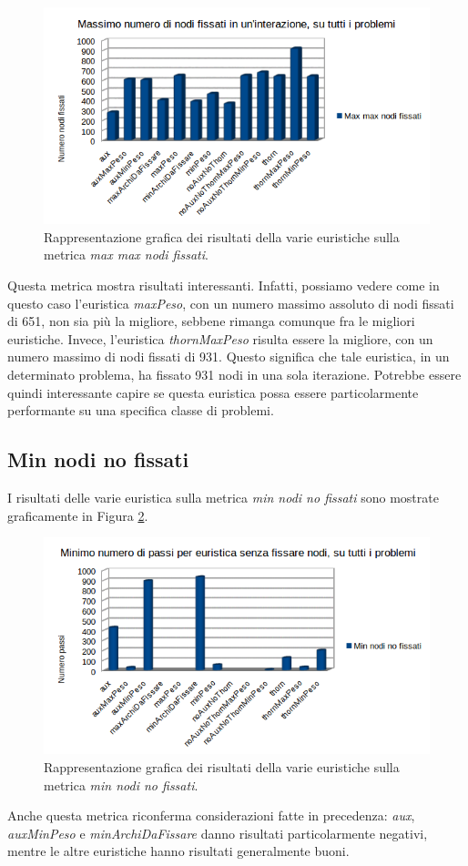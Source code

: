 \begin{figure}[H]
\includegraphics[width=\textwidth]{res/img/maxMaxNodiFissati.png}
\caption{Rappresentazione grafica dei risultati della varie euristiche sulla metrica \textit{max max nodi fissati}.}
\label{fig:maxMaxNodiFissati}
\end{figure}

Questa metrica mostra risultati interessanti. Infatti, possiamo vedere come in questo caso l'euristica \textit{maxPeso}, con un numero massimo assoluto di nodi fissati di 651, non sia più la migliore, sebbene rimanga comunque fra le migliori euristiche. Invece, l'euristica \textit{thornMaxPeso} risulta essere la migliore, con un numero massimo di nodi fissati di 931. Questo significa che tale euristica, in un determinato problema, ha fissato 931 nodi in una sola iterazione. Potrebbe essere quindi interessante capire se questa euristica possa essere particolarmente performante su una specifica classe di problemi.

\subsection{Min nodi no fissati}
I risultati delle varie euristica sulla metrica \textit{min nodi no fissati} sono mostrate graficamente in Figura \ref{fig:minNodiNoFissati}.

\begin{figure}[H]
\includegraphics[width=\textwidth]{res/img/minNodiNoFissati.png}
\caption{Rappresentazione grafica dei risultati della varie euristiche sulla metrica \textit{min nodi no fissati}.}
\label{fig:minNodiNoFissati}
\end{figure}

Anche questa metrica riconferma considerazioni fatte in precedenza: \textit{aux}, \textit{auxMinPeso} e \textit{minArchiDaFissare} danno risultati particolarmente negativi, mentre le altre euristiche hanno risultati generalmente buoni. 